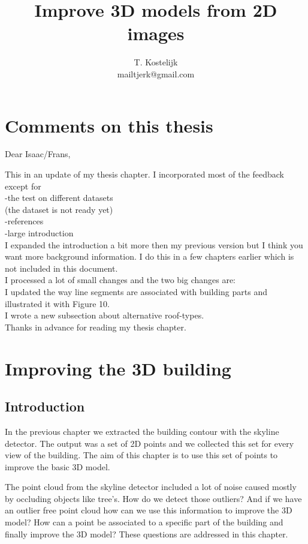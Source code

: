 \documentclass[10pt]{article}
\title{\sc Improve 3D models from 2D images}
\author{T. Kostelijk\\mailtjerk@gmail.com}
\begin{document}
\maketitle




\section{Comments on this thesis}
Dear Isaac/Frans,

This in an update of my thesis chapter. I incorporated most of the feedback except for\\
-the test on different datasets\\
(the dataset is not ready yet)\\
-references\\
-large introduction\\
I expanded the introduction a bit more then my previous version but I think you want more background
information. I do this in a few chapters earlier which is not included in this document.\\
I processed a lot of small changes and the two big changes are:\\
I updated the way line segments are associated with building parts and illustrated it with Figure 10.\\
I wrote a new subsection about alternative roof-types.\\
Thanks in advance for reading my thesis chapter.

 
\section{Improving the 3D building}
\subsection{Introduction}
In the previous chapter we extracted the building contour with the skyline
detector. The output was a set of 2D points and we collected this set for every
view of the building.  The aim of this chapter is to use this set of points to
improve the basic 3D model. 

The point cloud from the skyline detector included a lot of noise caused mostly
by occluding objects like tree's. How do we detect those outliers?
And if we have an outlier free point cloud how can we use this information to
improve the 3D model? How can a point be associated to a specific part of the
building and finally improve the 3D model? 
These questions are addressed in this chapter.
\end{document}
